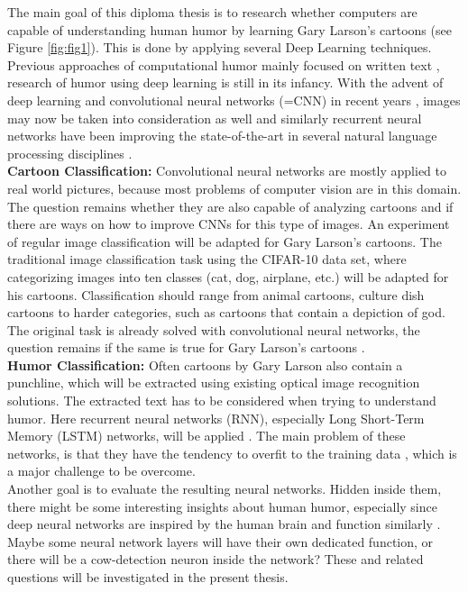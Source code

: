 \documentclass[draft,final,oneside]{vutinfth} %
\begin{document}
The main goal of this diploma thesis is to research whether computers are capable of understanding human humor by learning Gary Larson's cartoons (see Figure \ref{fig:fig1}). This is done by applying several Deep Learning techniques. \\


Previous approaches of computational humor mainly focused on written text \cite{Yang2015HumorRA}\cite{Bamman2015ContextualizedSD}\cite{HumoristBot}, research of humor using deep learning is still in its infancy. With the advent of deep learning and convolutional neural networks (=CNN) in recent years \cite{Druzhkov2016}, images may now be taken into consideration as well and similarly recurrent neural networks have been improving the state-of-the-art in several natural language processing disciplines \cite{reviewRNN}. \\

\textbf {Cartoon Classification:} \quad Convolutional neural networks are mostly applied to real world pictures, because most problems of computer vision are in this domain. The question remains whether they are also capable of analyzing cartoons and if there are ways on how to improve CNNs for this type of images. An experiment of regular image classification will be adapted for Gary Larson's cartoons. The traditional image classification task using the CIFAR-10 data set, where categorizing images into ten classes (cat, dog, airplane, etc.) will be adapted for his cartoons. Classification should range from animal cartoons, culture dish cartoons to harder categories, such as cartoons that contain a depiction of god. The original task is already solved with convolutional neural networks, the question remains if the same is true for Gary Larson's cartoons \cite{dogsvscats}. \\

\textbf {Humor Classification:} \quad Often cartoons by Gary Larson also contain a punchline, which will be extracted using existing optical image recognition solutions. The extracted text has to be considered when trying to understand humor. Here recurrent neural networks (RNN), especially Long Short-Term Memory (LSTM) networks, will be applied \cite{hochreiter}. The main problem of these networks, is that they have the tendency to overfit to the training data \cite[page 4]{reviewRNN}, which is a major challenge to be overcome. \\

Another goal is to evaluate the resulting neural networks. Hidden inside them, there might be some interesting insights about human humor, especially since deep neural networks are inspired by the human brain and function similarly \cite{Cichy2016}. Maybe some neural network layers will have their own dedicated function, or there will be a cow-detection neuron inside the network? These and related questions will be investigated in the present thesis.
\end{document}

